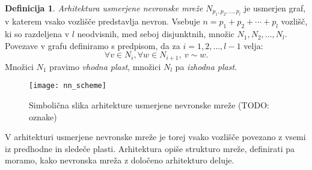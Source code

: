 \documentclass[12pt,a4paper,twoside]{article}
\theoremstyle{definition} %
\newtheorem{definicija}{Definicija}[section]
\theoremstyle{plain} %
\numberwithin{equation}{section}  %
\begin{document}
\begin{definicija}
\label{def:arhitektura}
	\emph{Arhitektura usmerjene nevronske mreže} $N_{p_1,p_2,\ldots,p_l}$ je usmerjen graf, v katerem vsako vozlišče predstavlja nevron. 
	Vsebuje $n= p_1+p_2+\cdots+p_l$ vozlišč, ki so razdeljena v $l$ neodvisnih, med seboj disjunktnih, množic $N_1, N_2, \ldots, N_l$. 
	Povezave v grafu definiramo s predpisom, da za $i=1,2,\ldots,l-1$ velja:
	\[
	\forall v \in N_i, \forall w \in N_{i+1},\ v \sim w.
	\]
	Množici $N_1$ pravimo \emph{vhodna plast}, množici $N_l$ pa \emph{izhodna plast}.
\end{definicija}

\begin{figure}[h!]
	\centering
	\texttt{[image: nn\_scheme]}
	\caption[Slika arhitekture usmerjene nevronske mreŽe]{Simbolična slika arhitekture usmerjene nevronske mreže (TODO: oznake)}
	\label{fig:arhitektura}
\end{figure}

V arhitekturi usmerjene nevronske mreže je torej vsako vozlišče povezano z vsemi iz predhodne in sledeče plasti.
Arhitektura opiše strukturo mreže, definirati pa moramo, kako nevronska mreža z določeno arhitekturo deluje.
\end{document}
